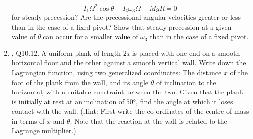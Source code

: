 \documentclass[../psets.tex]{subfiles}
\begin{document}
\begin{enumerate}
    \begin{equation*}
        I_1\Omega^2\cos\theta-I_3\omega_3\Omega+MgR = 0
    \end{equation*}
    for steady precession? Are the precessional angular velocities greater or less than in the case of a fixed pivot? Show that steady precession at a given value of $\theta$ can occur for a smaller value of $\omega_3$ than in the case of a fixed pivot.
    \item \textcite{bib:KibbleBerkshire}, Q10.12. A uniform plank of length $2a$ is placed with one end on a smooth horizontal floor and the other against a smooth vertical wall. Write down the Lagrangian function, using two generalized coordinates: The distance $x$ of the foot of the plank from the wall, and its angle $\theta$ of inclination to the horizontal, with a suitable constraint between the two. Given that the plank is initially at rest at an inclination of \ang{60}, find the angle at which it loses contact with the wall. (Hint: First write the co-ordinates of the centre of mass in terms of $x$ and $\theta$. Note that the reaction at the wall is related to the Lagrange multiplier.)
\end{enumerate}
\end{document}
